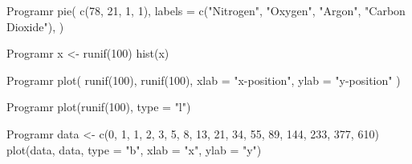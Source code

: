 
\begin{code}
    {Program}{r}
pie(
  c(78, 21, 1, 1),
  labels = c("Nitrogen", "Oxygen", "Argon", "Carbon Dioxide"),
)
\end{code}

\begin{code}
    {Program}{r}
x <- runif(100)
hist(x)
\end{code}

\newpage
{}
\begin{code}
    {Program}{r}
plot(
  runif(100),
  runif(100),
  xlab = "x-position",
  ylab = "y-position"
)
\end{code}

\begin{code}
    {Program}{r}
plot(runif(100), type = "l")
\end{code}

\newpage
{}
\begin{code}
    {Program}{r}
data <- c(0, 1, 1, 2, 3, 5, 8, 13, 21, 34, 55, 89, 144, 233, 377, 610)
plot(data, data, type = "b", xlab = "x", ylab = "y")
\end{code}
